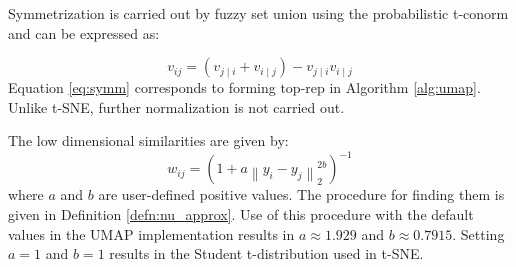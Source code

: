\documentclass[12pt]{article}
\begin{document}
Symmetrization is carried out by fuzzy set union using the probabilistic t-conorm and can be expressed as:

\begin{equation}\label{eq:symm}
    v_{ij} = \left(v_{j \mid i} + v_{i \mid j}\right) - v_{j \mid i} v_{i \mid j}
\end{equation}
Equation \ref{eq:symm} corresponds to forming $\text{top-rep}$ in Algorithm \ref{alg:umap}. Unlike t-SNE, further normalization is not carried out.

The low dimensional similarities are given by:
\begin{equation}
w_{ij} = \left(1 + a \left\lVert y_i - y_j \right\rVert _2^{2b}\right) ^ {-1}
\end{equation}
where $a$ and $b$ are user-defined positive values. The procedure for finding them is given in Definition \ref{defn:nu_approx}. Use of this procedure with the default values in the UMAP implementation results in $a \approx 1.929$ and $b \approx 0.7915$. Setting $a = 1$ and $b = 1$ results in the Student t-distribution used in t-SNE.

{}

\end{document}
